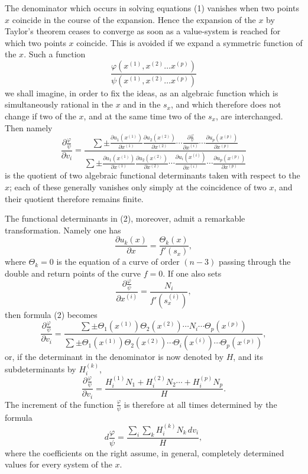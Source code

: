\documentclass[10pt]{article}
\begin{document}
The denominator which occurs in solving equations (1) vanishes when two points \(x\) coincide in the course of the expansion. Hence the expansion of the \(x\) by Taylor's theorem ceases to converge as soon as a value-system is reached for which two points \(x\) coincide. This is avoided if we expand a symmetric function of the \(x\). Such a function
\[
\frac{\varphi(x^{(1)},x^{(2)}\ldots x^{(p)})}{\psi(x^{(1)},x^{(2)}\ldots x^{(p)})}
\]
we shall imagine, in order to fix the ideas, as an algebraic function which is simultaneously rational in the \(x\) and in the \(s_x\), and which therefore does not change if two of the \(x\), and at the same time two of the \(s_x\), are interchanged. Then namely
\[
\tag{2}\frac{\partial\frac{\varphi}{\psi}}{\partial v_i}
=\frac{\displaystyle\sum \pm\frac{\partial u_1(x^{(1)})}{\partial x^{(1)}}\frac{\partial u_2(x^{(2)})}{\partial x^{(2)}}\cdots\frac{\partial\frac{\varphi}{\psi}}{\partial x^{(i)}}\cdots\frac{\partial u_p(x^{(p)})}{\partial x^{(p)}}}{\displaystyle\sum \pm\frac{\partial u_1(x^{(1)})}{\partial x^{(1)}}\frac{\partial u_2(x^{(2)})}{\partial x^{(2)}}\cdots\frac{\partial u_i(x^{(i)})}{\partial x^{(i)}}\cdots\frac{\partial u_p(x^{(p)})}{\partial x^{(p)}}}
\]
is the quotient of two algebraic functional determinants taken with respect to the \(x\); each of these generally vanishes only simply at the coincidence of two \(x\), and their quotient therefore remains finite.

The functional determinants in (2), moreover, admit a remarkable transformation. Namely one has
\[
\frac{\partial u_k(x)}{\partial x}=\frac{\Theta_k(x)}{f'(s_x)},
\]
where \(\Theta_k=0\) is the equation of a curve of order \((n-3)\) passing through the double and return points of the curve \(f=0\). If one also sets
\[
\frac{\partial\frac{\varphi}{\psi}}{\partial x^{(i)}}=\frac{N_i}{f'(s_x^{(i)})},
\]
then formula (2) becomes
\[
\tag{3}\frac{\partial\frac{\varphi}{\psi}}{\partial v_i}
=\frac{\sum\pm\Theta_1(x^{(1)})\Theta_2(x^{(2)})\cdots N_i\cdots\Theta_p(x^{(p)})}{\sum\pm\Theta_1(x^{(1)})\Theta_2(x^{(2)})\cdots\Theta_i(x^{(i)})\cdots\Theta_p(x^{(p)})},
\]
or, if the determinant in the denominator is now denoted by \(H\), and its subdeterminants by \(H_i^{(k)}\),
\[
\tag{4}\frac{\partial\frac{\varphi}{\psi}}{\partial v_i}=\frac{H_i^{(1)}N_1+H_i^{(2)}N_2\cdots+H_i^{(p)}N_p}{H}.
\]
The increment of the function \(\frac{\varphi}{\psi}\) is therefore at all times determined by the formula
\[
\tag{5}d\frac{\varphi}{\psi}=\frac{\sum_i\sum_k H_i^{(k)}N_k\,dv_i}{H},
\]
where the coefficients on the right assume, in general, completely determined values for every system of the \(x\).
\end{document}
